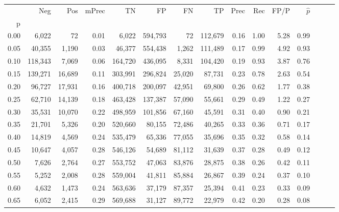 \begin{tabular}{rrrrrrrrrrrrrrr}
\toprule
{} &      Neg &     Pos & mPrec &       TN &       FP &       FN &       TP &  Prec &   Rec &  FP/P & $\hat{p}$ \\
p    &          &         &       &          &          &          &          &       &       &       &           \\
\midrule
0.00 &    6,022 &      72 &  0.01 &    6,022 &  594,793 &       72 &  112,679 &  0.16 &  1.00 &  5.28 &      0.99 \\
0.05 &   40,355 &   1,190 &  0.03 &   46,377 &  554,438 &    1,262 &  111,489 &  0.17 &  0.99 &  4.92 &      0.93 \\
0.10 &  118,343 &   7,069 &  0.06 &  164,720 &  436,095 &    8,331 &  104,420 &  0.19 &  0.93 &  3.87 &      0.76 \\
0.15 &  139,271 &  16,689 &  0.11 &  303,991 &  296,824 &   25,020 &   87,731 &  0.23 &  0.78 &  2.63 &      0.54 \\
0.20 &   96,727 &  17,931 &  0.16 &  400,718 &  200,097 &   42,951 &   69,800 &  0.26 &  0.62 &  1.77 &      0.38 \\
0.25 &   62,710 &  14,139 &  0.18 &  463,428 &  137,387 &   57,090 &   55,661 &  0.29 &  0.49 &  1.22 &      0.27 \\
0.30 &   35,531 &  10,070 &  0.22 &  498,959 &  101,856 &   67,160 &   45,591 &  0.31 &  0.40 &  0.90 &      0.21 \\
0.35 &   21,701 &   5,326 &  0.20 &  520,660 &   80,155 &   72,486 &   40,265 &  0.33 &  0.36 &  0.71 &      0.17 \\
0.40 &   14,819 &   4,569 &  0.24 &  535,479 &   65,336 &   77,055 &   35,696 &  0.35 &  0.32 &  0.58 &      0.14 \\
0.45 &   10,647 &   4,057 &  0.28 &  546,126 &   54,689 &   81,112 &   31,639 &  0.37 &  0.28 &  0.49 &      0.12 \\
0.50 &    7,626 &   2,764 &  0.27 &  553,752 &   47,063 &   83,876 &   28,875 &  0.38 &  0.26 &  0.42 &      0.11 \\
0.55 &    5,252 &   2,008 &  0.28 &  559,004 &   41,811 &   85,884 &   26,867 &  0.39 &  0.24 &  0.37 &      0.10 \\
0.60 &    4,632 &   1,473 &  0.24 &  563,636 &   37,179 &   87,357 &   25,394 &  0.41 &  0.23 &  0.33 &      0.09 \\
0.65 &    6,052 &   2,415 &  0.29 &  569,688 &   31,127 &   89,772 &   22,979 &  0.42 &  0.20 &  0.28 &      0.08 \\

\end{tabular}

